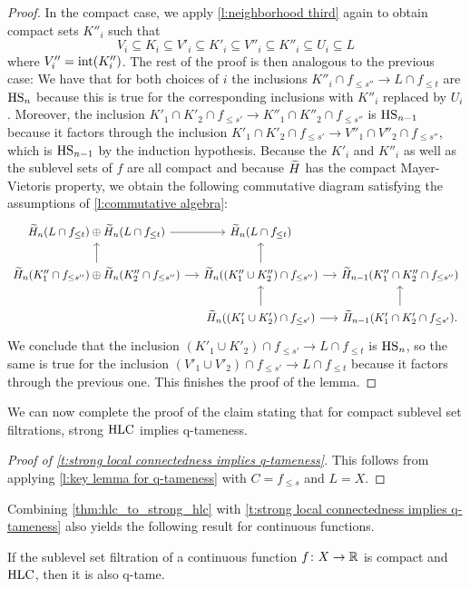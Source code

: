 \begin{proof}
	In the compact case, we apply \cref{l:neighborhood third} again to obtain compact sets $K''_i$ such that
	\[V_i \subseteq K_i \subseteq V'_i \subseteq K'_i \subseteq V''_i \subseteq K''_i \subseteq U_i \subseteq L\]
	where $V''_i = \operatorname{int}(K''_i)$. The rest of the proof is then analogous to the previous case:
	We have that for both choices of $i$ the inclusions
	$K''_i \cap f_{\leq s''} \to L \cap f_{\leq t}$
	are $\mathrm{HS}_n$ because this is true for the corresponding inclusions with $K''_i$ replaced by $U_i$.
	Moreover, the inclusion
	$K'_1 \cap K'_2 \cap f_{\leq s'} \to K''_1 \cap K''_2 \cap f_{\leq s''}$
	is $\mathrm{HS}_{n-1}$ because it factors through the inclusion
	$K'_1 \cap K'_2 \cap f_{\leq s'} \to V''_1 \cap V''_2 \cap f_{\leq s''}$,
	which is $\mathrm{HS}_{n-1}$ by the induction hypothesis.
	Because the $K'_i$ and $K''_i$ as well as the sublevel sets of $f$ are all compact and because $\widetilde{H}$ has the compact Mayer-Vietoris property, we obtain the following commutative diagram satisfying the assumptions of \cref{l:commutative algebra}:
	\[
	\begin{tikzcd}[column sep=small]
	\H_n(L \cap f_{\leq t}) \oplus \H_n(L \cap f_{\leq t}) \arrow[r] &
	\H_n(L \cap f_{\leq t}) & \\
	\H_{n}(K''_1 \cap f_{\leq s''}) \oplus \H_n(K''_2 \cap f_{\leq s''}) \arrow[r] \arrow[u] & 
	\H_{n}((K''_1 \cup K''_2) \cap f_{\leq s''}) \arrow[r] \arrow[u] &
	\H_{n-1}(K''_1 \cap K''_2 \cap f_{\leq s''}) \\ & 
	\H_{n}((K'_1 \cup K'_2) \cap f_{\leq s'}) \arrow[r] \arrow[u] &
	\H_{n-1}(K'_1 \cap K'_2 \cap f_{\leq s'}). \arrow[u]
	\end{tikzcd}
	\]
	We conclude that the inclusion 
	$\left(K'_1 \cup K'_2 \right) \cap f_{\leq s'} \to L \cap f_{\leq t}$
	is $\mathrm{HS}_n$, so the same is true for the inclusion
	$\left(V'_1 \cup V'_2 \right) \cap f_{\leq s'} \to L \cap f_{\leq t}$ 
	because it factors through the previous one. This finishes the proof of the lemma.
\end{proof}

We can now complete the proof of the claim stating that for compact sublevel set filtrations, strong $\mathrm{HLC}$ implies q-tameness. 

\begin{proof}[Proof of \cref{t:strong local connectedness implies q-tameness}]
	This follows from applying \cref{l:key lemma for q-tameness} with $C = f_{\leq s}$ and $L = X$.
\end{proof}

Combining \cref{thm:hlc_to_strong_hlc} with \cref{t:strong local connectedness implies q-tameness} also yields the following result for continuous functions.

\begin{cor}
    If the sublevel set filtration of a continuous function $f \colon X \to \mathbb{R}$ is compact and $\mathrm{HLC}$, then it is also q-tame.
\end{cor}
